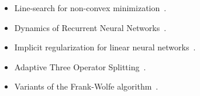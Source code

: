 \begin{itemize}

\item Line-search for non-convex minimization~\citep{vaswani2019painless}.

\item Dynamics of Recurrent Neural Networks~\citep{kerg2019non}.

\item Implicit regularization for linear neural networks~\citep{gidel2019implicit}.

\item Adaptive Three Operator Splitting~\citep{pedregosa2018adaptive}.

\item Variants of the Frank-Wolfe algorithm~\citep{gidel2017frank,gidel2018frank}. 

\end{itemize}



















